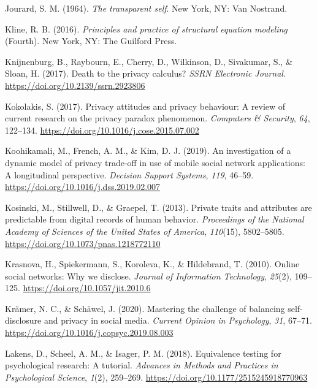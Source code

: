 \documentclass[
  english,
  man,floatsintext]{apa6}
\begin{document}
\leavevmode\hypertarget{ref-jourardTransparentSelf1964}{}%
Jourard, S. M. (1964). \emph{The transparent self}. New York, NY: Van Nostrand.

\leavevmode\hypertarget{ref-klinePrinciplesPracticeStructural2016}{}%
Kline, R. B. (2016). \emph{Principles and practice of structural equation modeling} (Fourth). New York, NY: The Guilford Press.

\leavevmode\hypertarget{ref-knijnenburgDeathPrivacyCalculus2017}{}%
Knijnenburg, B., Raybourn, E., Cherry, D., Wilkinson, D., Sivakumar, S., \& Sloan, H. (2017). Death to the privacy calculus? \emph{SSRN Electronic Journal}. \url{https://doi.org/10.2139/ssrn.2923806}

\leavevmode\hypertarget{ref-kokolakisPrivacyAttitudesPrivacy2017}{}%
Kokolakis, S. (2017). Privacy attitudes and privacy behaviour: A review of current research on the privacy paradox phenomenon. \emph{Computers \& Security}, \emph{64}, 122--134. \url{https://doi.org/10.1016/j.cose.2015.07.002}

\leavevmode\hypertarget{ref-koohikamaliInvestigationDynamicModel2019}{}%
Koohikamali, M., French, A. M., \& Kim, D. J. (2019). An investigation of a dynamic model of privacy trade-off in use of mobile social network applications: A longitudinal perspective. \emph{Decision Support Systems}, \emph{119}, 46--59. \url{https://doi.org/10.1016/j.dss.2019.02.007}

\leavevmode\hypertarget{ref-kosinskiPrivateTraitsAttributes2013}{}%
Kosinski, M., Stillwell, D., \& Graepel, T. (2013). Private traits and attributes are predictable from digital records of human behavior. \emph{Proceedings of the National Academy of Sciences of the United States of America}, \emph{110}(15), 5802--5805. \url{https://doi.org/10.1073/pnas.1218772110}

\leavevmode\hypertarget{ref-krasnovaOnlineSocialNetworks2010}{}%
Krasnova, H., Spiekermann, S., Koroleva, K., \& Hildebrand, T. (2010). Online social networks: Why we disclose. \emph{Journal of Information Technology}, \emph{25}(2), 109--125. \url{https://doi.org/10.1057/jit.2010.6}

\leavevmode\hypertarget{ref-kramerMasteringChallengeBalancing2020}{}%
Krämer, N. C., \& Schäwel, J. (2020). Mastering the challenge of balancing self-disclosure and privacy in social media. \emph{Current Opinion in Psychology}, \emph{31}, 67--71. \url{https://doi.org/10.1016/j.copsyc.2019.08.003}

\leavevmode\hypertarget{ref-lakensEquivalenceTestingPsychological2018}{}%
Lakens, D., Scheel, A. M., \& Isager, P. M. (2018). Equivalence testing for psychological research: A tutorial. \emph{Advances in Methods and Practices in Psychological Science}, \emph{1}(2), 259--269. \url{https://doi.org/10.1177/2515245918770963}
\end{document}
